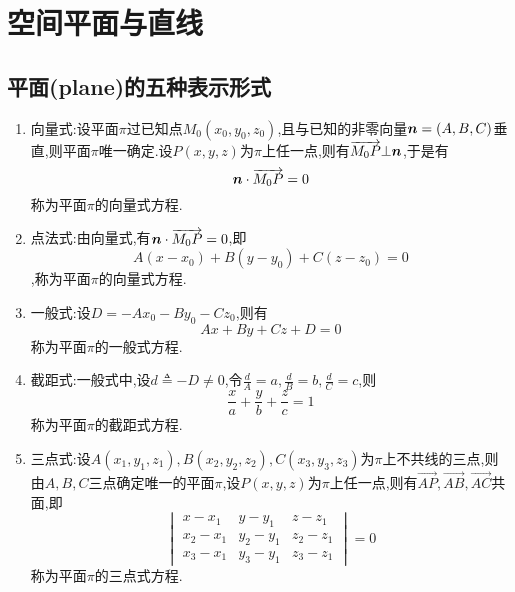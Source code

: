 \chapter{空间平面与直线}

\section{平面(plane)的五种表示形式}

\begin{definition}[平面的五种表示形式]
    \begin{enumerate}
        \item 向量式:设平面$\pi$过已知点$M_0(x_0,y_0,z_0)$,且与已知的非零向量$\bm{n}=(A,B,C)$垂直,则平面$\pi$唯一确定.设$P(x,y,z)$为$\pi$上任一点,则有$\overrightarrow{M_0P}\bot\bm{n}$,于是有$$\bm{n}\cdot \overrightarrow{M_0P}=0$$称为平面$\pi$的向量式方程.
        \item 点法式:由向量式,有$\bm{n}\cdot \overrightarrow{M_0P}=0$,即$$A(x-x_0)+B(y-y_0)+C(z-z_0)=0$$,称为平面$\pi$的向量式方程.
        \item 一般式:设$D=-Ax_0-By_0-Cz_0$,则有$$Ax+By+Cz+D=0$$称为平面$\pi$的一般式方程.
        \item 截距式:一般式中,设$d\triangleq-D\neq 0$,令$\frac{d}{A}=a,\frac{d}{B}=b,\frac{d}{C}=c$,则$$\frac{x}{a}+\frac{y}{b}+\frac{z}{c}=1$$称为平面$\pi$的截距式方程.
        \item 三点式:设$A(x_1,y_1,z_1),B(x_2,y_2,z_2),C(x_3,y_3,z_3)$为$\pi$上不共线的三点,则由$A,B,C$三点确定唯一的平面$\pi$,设$P(x,y,z)$为$\pi$上任一点,则有$\overrightarrow{AP},\overrightarrow{AB},\overrightarrow{AC}$共面,即$$\begin{vmatrix}x-x_1&y-y_1&z-z_1\\x_2-x_1&y_2-y_1&z_2-z_1\\x_3-x_1&y_3-y_1&z_3-z_1\end{vmatrix}=0$$称为平面$\pi$的三点式方程.
    \end{enumerate}
\end{definition}

